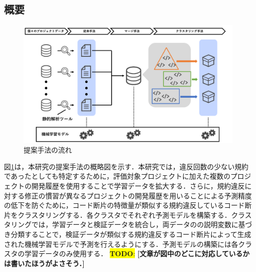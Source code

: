 \documentclass[T,J]{fose} %
\newcommand{\todo}[1]{\colorbox{yellow}{{\bf TODO}:}{\color{red} {\textbf{[#1]}}}}
\begin{document}
\subsection{概要}
\begin{figure}[t]
	\centering
	\includegraphics[width=1.0\linewidth]{Kameoka_fig/syuhou2.pdf}
	\caption{提案手法の流れ}
	\label{fig:Teiannsyuhou}
\end{figure}

図\ref{fig:Teiannsyuhou}は，本研究の提案手法の概略図を示す．本研究では，違反回数の少ない規約であったとしても特定するために，評価対象プロジェクトに加えた複数のプロジェクトの開発履歴を使用することで学習データを拡大する．さらに，規約違反に対する修正の慣習が異なるプロジェクトの開発履歴を用いることによる予測精度の低下を防ぐために，コード断片の特徴量が類似する規約違反しているコード断片をクラスタリングする．各クラスタでそれぞれ予測モデルを構築する．クラスタリングでは，学習データと検証データを統合し，両データのの説明変数に基づき分類することで，検証データが類似する規約違反するコード断片によって生成された機械学習モデルで予測を行えるようにする．予測モデルの構築には各クラスタの学習データのみ使用する．
\todo{文章が図中のどこに対応しているかは書いたほうがよさそう．}

\end{document}
